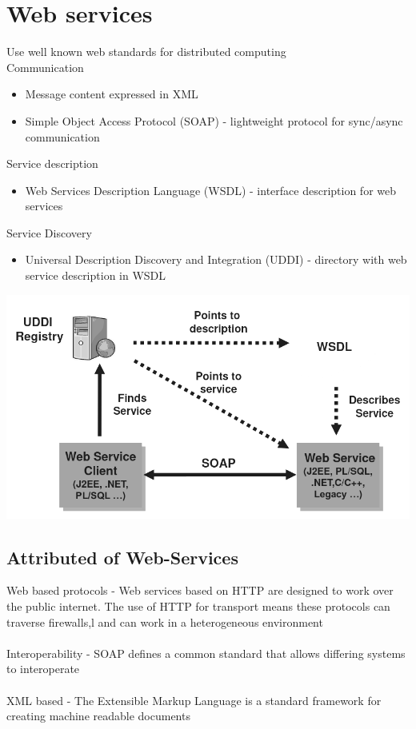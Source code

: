 \documentclass{article}[18pt]
\begin{document}
\section{Web services}
Use well known web standards for distributed computing\\
Communication
\begin{itemize}
	\item Message content expressed in XML
	\item Simple Object Access Protocol (SOAP) - lightweight protocol for sync/async communication
\end{itemize}
Service description
\begin{itemize}
	\item Web Services Description Language (WSDL) - interface description for web services
\end{itemize}
Service Discovery
\begin{itemize}
	\item Universal Description Discovery and Integration (UDDI) - directory with web service description in WSDL
\end{itemize}

\begin{center}
	\includegraphics[scale=0.5]{"Web Services"}
\end{center}
\subsection{Attributed of Web-Services}
Web based protocols - Web services based on HTTP are designed to work over the public internet. The use of HTTP for transport means these protocols can traverse firewalls,l and can work in a heterogeneous environment\\
\\
Interoperability - SOAP defines a common standard that allows differing systems to interoperate\\
\\
XML based - The Extensible Markup Language is a standard framework for creating machine readable documents
\end{document}
